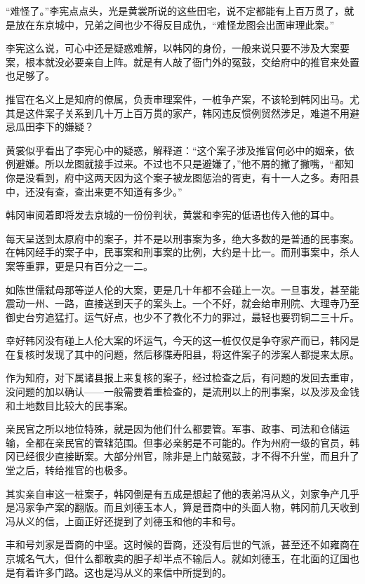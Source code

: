 “难怪了。”李宪点点头，光是黄裳所说的这些田宅，说不定都能有上百万贯了，就是放在东京城中，兄弟之间也少不得反目成仇，“难怪龙图会出面审理此案。”

李宪这么说，可心中还是疑惑难解，以韩冈的身份，一般来说只要不涉及大案要案，根本就没必要亲自上阵。就是有人敲了衙门外的冤鼓，交给府中的推官来处置也足够了。

推官在名义上是知府的僚属，负责审理案件，一桩争产案，不该轮到韩冈出马。尤其是这件案子关系到几十万上百万贯的家产，韩冈违反惯例贸然涉足，难道不用避忌瓜田李下的嫌疑？

黄裳似乎看出了李宪心中的疑惑，解释道：“这个案子涉及推官何必中的姻亲，依例避嫌。所以龙图就接手过来。不过也不只是避嫌了，”他不屑的撇了撇嘴，“都知你是没看到，府中这两天因为这个案子被龙图惩治的胥吏，有十一人之多。寿阳县中，还没有查，查出来更不知道有多少。”

韩冈审阅着即将发去京城的一份份判状，黄裳和李宪的低语也传入他的耳中。

每天呈送到太原府中的案子，并不是以刑事案为多，绝大多数的是普通的民事案。在韩冈经手的案子中，民事案和刑事案的比例，大约是十比一。而刑事案中，杀人案等重罪，更是只有百分之一二。

如陈世儒弑母那等逆人伦的大案，更是几十年都不会碰上一次。一旦事发，甚至能震动一州、一路，直接送到天子的案头上。一个不好，就会给审刑院、大理寺乃至御史台穷追猛打。运气好点，也少不了教化不力的罪过，最轻也要罚铜二三十斤。

幸好韩冈没有碰上人伦大案的坏运气，今天的这一桩仅仅是争夺家产而已，韩冈是在复核时发现了其中的问题，然后移牒寿阳县，将这件案子的涉案人都提来太原。

作为知府，对下属诸县报上来复核的案子，经过检查之后，有问题的发回去重审，没问题的加以确认——一般需要着重检查的，是流刑以上的刑事案，以及涉及金钱和土地数目比较大的民事案。

亲民官之所以地位特殊，就是因为他们什么都要管。军事、政事、司法和仓储运输，全都在亲民官的管辖范围。但事必亲躬是不可能的。作为州府一级的官员，韩冈已经很少直接断案。大部分州官，除非是上门敲冤鼓，才不得不升堂，而且升了堂之后，转给推官的也极多。

其实亲自审这一桩案子，韩冈倒是有五成是想起了他的表弟冯从义，刘家争产几乎是冯家争产案的翻版。而且刘德玉本人，算是晋商中的头面人物，韩冈前几天收到冯从义的信，上面正好还提到了刘德玉和他的丰和号。

丰和号刘家是晋商的中坚。这时候的晋商，还没有后世的气派，甚至还不如雍商在京城名气大，但什么都敢卖的胆子却半点不输后人。就如刘德玉，在北面的辽国也是有着许多门路。这也是冯从义的来信中所提到的。

